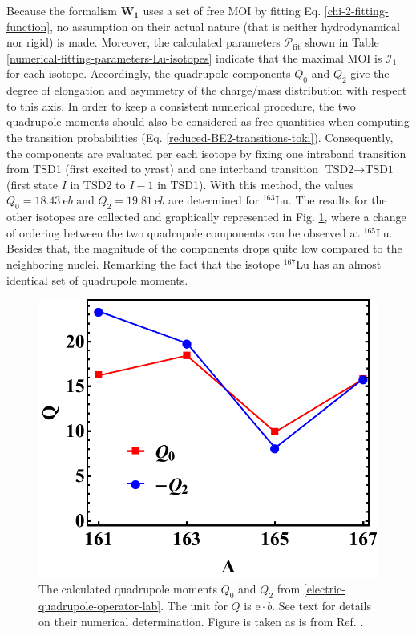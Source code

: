 Because the formalism $\mathbf{W_1}$ uses a set of free MOI by fitting Eq. \ref{chi-2-fitting-function}, no assumption on their actual nature (that is neither hydrodynamical nor rigid) is made. Moreover, the calculated parameters $\mathcal{P}_\text{fit}$ shown in Table \ref{numerical-fitting-parameters-Lu-isotopes} indicate that the maximal MOI is $\mathcal{I}_1$ for each isotope. Accordingly, the quadrupole components $Q_{0}$ and $Q_{2}$ give the degree of elongation and asymmetry of the charge/mass distribution with respect to this axis. In order to keep a consistent numerical procedure, the two quadrupole moments should also be considered as free quantities when computing the transition probabilities (Eq. \ref{reduced-BE2-transitions-toki}). Consequently, the components are evaluated per each isotope by fixing one intraband transition from TSD1 (first excited to yrast) and one interband transition $\text{TSD2}\to\text{TSD1}$ (first state $I$ in TSD2 to $I-1$ in TSD1). With this method, the values $Q_0=18.43\ \mathrm{e}b$ and $Q_2=19.81\ \mathrm{e}b$ are determined for $^{163}$Lu. The results for the other isotopes are collected and graphically represented in Fig. \ref{quadrupole-moments-fit-numerical-results}, where a change of ordering between the two quadrupole components can be observed at $^{165}$Lu. Besides that, the magnitude of the components drops quite low compared to the neighboring nuclei. Remarking the fact that the isotope $^{167}$Lu has an almost identical set of quadrupole moments.
\begin{figure}
    \centering
    \includegraphics[scale=0.65]{Chapters/Figures/Lu-exp-energies/fig19.pdf}
    \caption{The calculated quadrupole moments $Q_0$ and $Q_2$ from \ref{electric-quadrupole-operator-lab}. The unit for $Q$ is $\mathrm{e}\cdot b$. See text for details on their numerical determination. Figure is taken as is from Ref. \cite{raduta2020approach}.}
    \label{quadrupole-moments-fit-numerical-results}
\end{figure}

